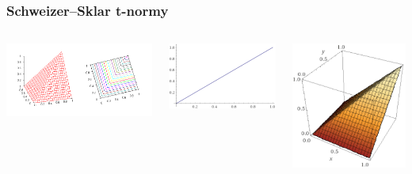 \documentclass{beamer}
\begin{document}


\begin{frame}
\frametitle{Schweizer–Sklar t-normy}
\begin{columns}
\begin{minipage}[c][0.4\textheight][c]{\linewidth}
  \centering
  \includegraphics[width=1.1\linewidth]{MinimumTnorm}
\end{minipage}
\begin{minipage}[c][0.4\textheight][c]{\linewidth}
  \centering
  \includegraphics[width=0.7\linewidth]{minDiag}
\end{minipage}
\begin{minipage}[c][0.4\textheight][c]{\linewidth}
  \centering
  \includegraphics[width=0.5\linewidth]{SS-19000}

\end{minipage}
\end{columns}
\end{frame}
\end{document}

